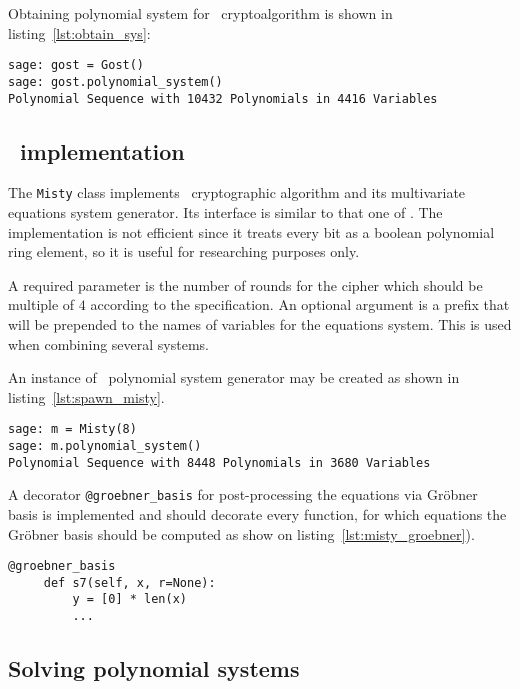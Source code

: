 Obtaining polynomial system for \gost\ cryptoalgorithm is shown in
listing~\ref{lst:obtain_sys}:

\begin{lstlisting}[label=lst:obtain_sys, caption=Obtaining polynomial system]
sage: gost = Gost()
sage: gost.polynomial_system()
Polynomial Sequence with 10432 Polynomials in 4416 Variables
\end{lstlisting}


\subsection{\misty\ implementation}

The \verb+Misty+ class implements \misty\ cryptographic algorithm and its
multivariate equations system generator. Its interface is similar to that one of 
\gost. The implementation is not
efficient since it treats every bit as a boolean polynomial ring element, so it
is useful for researching purposes only. 

A required parameter is the number of rounds for the cipher which should be
multiple of $4$ according to the specification. An optional argument is a prefix
that will be prepended to the names of variables for the equations system. This
is used when combining several systems.

An instance of \misty\ polynomial system generator may be created as shown in
listing~\ref{lst:spawn_misty}.
\begin{lstlisting}[label=lst:spawn_misty, caption=Creating MISTY1 instance]
sage: m = Misty(8)         
sage: m.polynomial_system()
Polynomial Sequence with 8448 Polynomials in 3680 Variables
\end{lstlisting}

A decorator \verb+@groebner_basis+ for post-processing the equations via
Gr\"obner basis is implemented and should decorate every function, for which
equations the Gr\"obner basis should be computed as show on
listing~\ref{lst:misty_groebner}).

\begin{lstlisting}[label=lst:misty_groebner, caption=Misty Gr\"obner basis]
     @groebner_basis                                                             
     def s7(self, x, r=None):                                                    
         y = [0] * len(x)
         ...
\end{lstlisting}


\subsection{Solving polynomial systems}
\label{sec:soft-solving}

